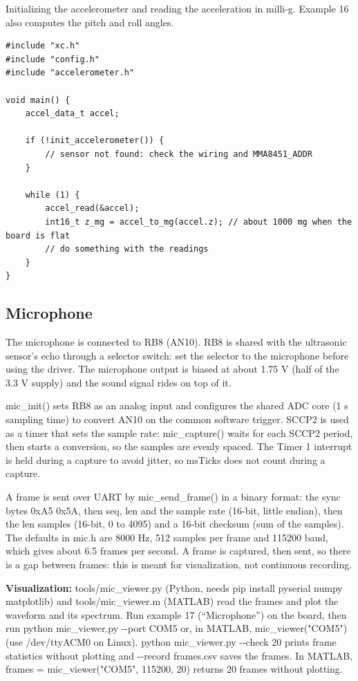 \documentclass[
  11pt,
  letterpaper,
  oneside,
  DIV=13,               %
  parskip=half,          %
  headings=normal,
  chapterprefix=false,
  toc=listof,
  numbers=noenddot,
]{scrbook}
\begin{document}
Initializing the accelerometer and reading the acceleration in milli-g. Example 16 also computes the pitch and roll angles.
\begin{lstlisting}
#include "xc.h"
#include "config.h"
#include "accelerometer.h"

void main() {
    accel_data_t accel;

    if (!init_accelerometer()) {
        // sensor not found: check the wiring and MMA8451_ADDR
    }

    while (1) {
        accel_read(&accel);
        int16_t z_mg = accel_to_mg(accel.z); // about 1000 mg when the board is flat
        // do something with the readings
    }
}
\end{lstlisting}

\subsection{Microphone}

The microphone is connected to RB8 (AN10). RB8 is shared with the ultrasonic sensor's echo through a selector switch: set the selector to the microphone before using the driver. The microphone output is biased at about 1.75 V (half of the 3.3 V supply) and the sound signal rides on top of it.

mic\_init() sets RB8 as an analog input and configures the shared ADC core (1 \textmu{}s sampling time) to convert AN10 on the common software trigger. SCCP2 is used as a timer that sets the sample rate: mic\_capture() waits for each SCCP2 period, then starts a conversion, so the samples are evenly spaced. The Timer 1 interrupt is held during a capture to avoid jitter, so msTicks does not count during a capture.

A frame is sent over UART by mic\_send\_frame() in a binary format: the sync bytes 0xA5 0x5A, then seq, len and the sample rate (16-bit, little endian), then the len samples (16-bit, 0 to 4095) and a 16-bit checksum (sum of the samples). The defaults in mic.h are 8000 Hz, 512 samples per frame and 115200 baud, which gives about 6.5 frames per second. A frame is captured, then sent, so there is a gap between frames: this is meant for visualization, not continuous recording.

\textbf{Visualization: }tools/mic\_viewer.py (Python, needs pip install pyserial numpy matplotlib) and tools/mic\_viewer.m (MATLAB) read the frames and plot the waveform and its spectrum. Run example 17 (``Microphone'') on the board, then run python mic\_viewer.py -{}-port COM5 or, in MATLAB, mic\_viewer("COM5") (use /dev/ttyACM0 on Linux). python mic\_viewer.py -{}-check 20 prints frame statistics without plotting and -{}-record frames.csv saves the frames. In MATLAB, frames = mic\_viewer("COM5", 115200, 20) returns 20 frames without plotting.
\end{document}
